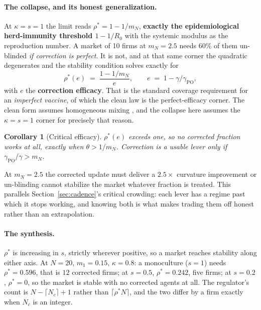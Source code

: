\documentclass{article}
\theoremstyle{plain}
\newtheorem{corollary}[theorem]{Corollary}
\theoremstyle{definition}
\newcommand{\mN}{m_N}
\begin{document}
\paragraph{The collapse, and its honest generalization.}
At $\kappa = s = 1$ the limit reads $\rho^{*} = 1 - 1/\mN$, \textbf{exactly the epidemiological herd-immunity threshold $1-1/R_0$} with the systemic modulus as the reproduction number. A market of 10 firms at $\mN = 2.5$ needs 60\% of them un-blinded \emph{if correction is perfect}. It is not, and at that same corner the quadratic degenerates and the stability condition solves exactly for
\begin{equation}
\rho^{*}(e) \;=\; \frac{1 - 1/\mN}{e}, \qquad e \;=\; 1 - \gamma/\gamma_{\mathrm{PO}},
\end{equation}
with $e$ the \textbf{correction efficacy}. That is the standard coverage requirement for an \emph{imperfect vaccine}, of which the clean law is the perfect-efficacy corner. The clean form assumes homogeneous mixing \citep{fine2011}, and the collapse here assumes the $\kappa=s=1$ corner for precisely that reason.

\begin{corollary}[Critical efficacy]
\label{cor:efficacy}
$\rho^{*}(e)$ exceeds one, so no corrected fraction works at all, exactly when $\theta > 1/\mN$. Correction is a usable lever only if $\gamma_{\mathrm{PO}}/\gamma > \mN$.
\end{corollary}

At $\mN = 2.5$ the corrected update must deliver a $2.5\times$ curvature improvement or un-blinding cannot stabilize the market whatever fraction is treated. This parallels Section~\ref{sec:cadence}'s critical crowding: each lever has a regime past which it stops working, and knowing both is what makes trading them off honest rather than an extrapolation.

\paragraph{The synthesis.}
$\rho^{*}$ is increasing in $s$, strictly wherever positive, so a market reaches stability along either axis. At $N=20$, $m_1 = 0.15$, $\kappa = 0.8$: a monoculture ($s=1$) needs $\rho^{*} = 0.596$, that is $12$ corrected firms; at $s = 0.5$, $\rho^{*} = 0.242$, five firms; at $s = 0.2$, $\rho^{*} = 0$, so the market is stable with no corrected agents at all. The regulator's count is $N - \lceil N_c \rceil + 1$ rather than $\lceil \rho^{*}N \rceil$, and the two differ by a firm exactly when $N_c$ is an integer.
\end{document}

